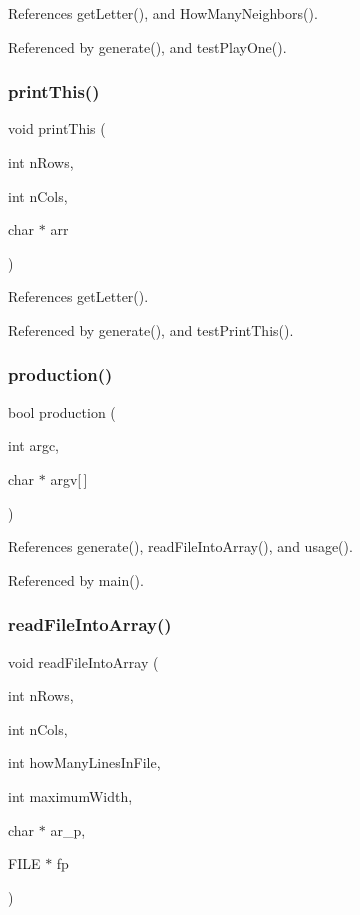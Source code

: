 References get\+Letter(), and How\+Many\+Neighbors().



Referenced by generate(), and test\+Play\+One().

\mbox{\label{production_8c_a64c54ced6f18dab02f59e625d2afa1b2}} 
\subsubsection{print\+This()}
{\footnotesize\ttfamily void print\+This (\begin{DoxyParamCaption}\item[{int}]{n\+Rows,  }\item[{int}]{n\+Cols,  }\item[{char $\ast$}]{arr }\end{DoxyParamCaption})}



References get\+Letter().



Referenced by generate(), and test\+Print\+This().

\mbox{\label{production_8c_a9f67b51c42a54745557e7a2c9c07c46f}} 
\subsubsection{production()}
{\footnotesize\ttfamily bool production (\begin{DoxyParamCaption}\item[{int}]{argc,  }\item[{char $\ast$}]{argv[$\,$] }\end{DoxyParamCaption})}



References generate(), read\+File\+Into\+Array(), and usage().



Referenced by main().

\mbox{\label{production_8c_a0acda6eca9bfeb1059c53811d22b7996}} 
\subsubsection{read\+File\+Into\+Array()}
{\footnotesize\ttfamily void read\+File\+Into\+Array (\begin{DoxyParamCaption}\item[{int}]{n\+Rows,  }\item[{int}]{n\+Cols,  }\item[{int}]{how\+Many\+Lines\+In\+File,  }\item[{int}]{maximum\+Width,  }\item[{char $\ast$}]{ar\+\_\+p,  }\item[{F\+I\+LE $\ast$}]{fp }\end{DoxyParamCaption})}



